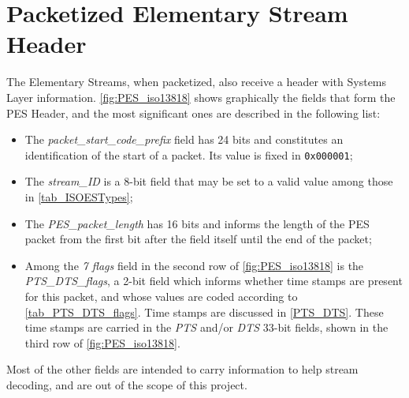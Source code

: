 \documentclass[
	12pt,				%
	openright,			%
	twoside,			%
	a4paper,			%
	brazil,
	french,				%
	english
	]{abntex2}
\begin{document}
\section{Packetized Elementary Stream Header}

The Elementary Streams, when packetized, also receive a header with Systems Layer information. \autoref{fig:PES_iso13818} shows graphically the fields that form the PES Header, and the most significant ones are described in the following list:
\begin{itemize}
\item{The \textit{packet\hspace{0.1mm}\_\hspace{0.1mm}start\hspace{0.1mm}\_\hspace{0.1mm}code\hspace{0.1mm}\_\hspace{0.1mm}prefix} field has 24 bits and constitutes an identification of the start of a packet. Its value is fixed in \texttt{0x000001};}
\item{The \textit{stream\hspace{0.1mm}\_\hspace{0.1mm}ID} is a 8-bit field that may be set to a valid value among those in \autoref{tab_ISOESTypes};}
\item{The \textit{PES\hspace{0.1mm}\_\hspace{0.1mm}packet\hspace{0.1mm}\_\hspace{0.1mm}length} has 16 bits and informs the length of the PES packet from the first bit after the field itself until the end of the packet;}
\item{Among the \textit{7 flags} field in the second row of \autoref{fig:PES_iso13818} is the \textit{PTS\hspace{0.1mm}\_\hspace{0.1mm}DTS\hspace{0.1mm}\_\hspace{0.1mm}flags}, a 2-bit field which informs whether time stamps are present for this packet, and whose values are coded according to \autoref{tab_PTS_DTS_flags}. Time stamps are discussed in \autoref{PTS_DTS}. These time stamps are carried in the \textit{PTS} and/or \textit{DTS} 33-bit fields, shown in the third row of \autoref{fig:PES_iso13818}.}
\end{itemize}

Most of the other fields are intended to carry information to help stream decoding, and are out of the scope of this project.
\end{document}
